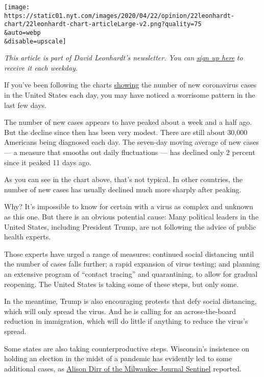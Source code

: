 \texttt{[image: https://static01.nyt.com/images/2020/04/22/opinion/22leonhardt-chart/22leonhardt-chart-articleLarge-v2.png?quality=75\\\&auto=webp\\\&disable=upscale]}

\emph{This article is part of David Leonhardt's newsletter. You can}
\href{https://www.nytimes.com/newsletters/opiniontoday?action=click\&module=Intentional\&pgtype=Article}{\emph{sign
up here}} \emph{to receive it each weekday.}

If you've been following the charts
\href{https://www.nytimes.com/interactive/2020/us/coronavirus-us-cases.html}{showing}
the number of new coronavirus cases in the United States each day, you
may have noticed a worrisome pattern in the last few days.

The number of new cases appears to have peaked about a week and a half
ago. But the decline since then has been very modest. There are still
about 30,000 Americans being diagnosed each day. The seven-day moving
average of new cases --- a measure that smooths out daily fluctuations
--- has declined only 2 percent since it peaked 11 days ago.

As you can see in the chart above, that's not typical. In other
countries, the number of new cases has usually declined much more
sharply after peaking.

Why? It's impossible to know for certain with a virus as complex and
unknown as this one. But there is an obvious potential cause: Many
political leaders in the United States, including President Trump, are
not following the advice of public health experts.

Those experts have urged a range of measures: continued social
distancing until the number of cases falls further; a rapid expansion of
virus testing; and planning an extensive program of ``contact tracing''
and quarantining, to allow for gradual reopening. The United States is
taking some of these steps, but only some.

In the meantime, Trump is also encouraging protests that defy social
distancing, which will only spread the virus. And he is calling for an
across-the-board reduction in immigration, which will do little if
anything to reduce the virus's spread.

Some states are also taking counterproductive steps. Wisconsin's
insistence on holding an election in the midst of a pandemic has
evidently led to some additional cases, as
\href{https://www.jsonline.com/story/news/local/milwaukee/2020/04/20/coronavirus-milwaukee-7-new-cases-may-tied-april-7-election/5168669002/}{Alison
Dirr of the Milwaukee Journal Sentinel} reported.

